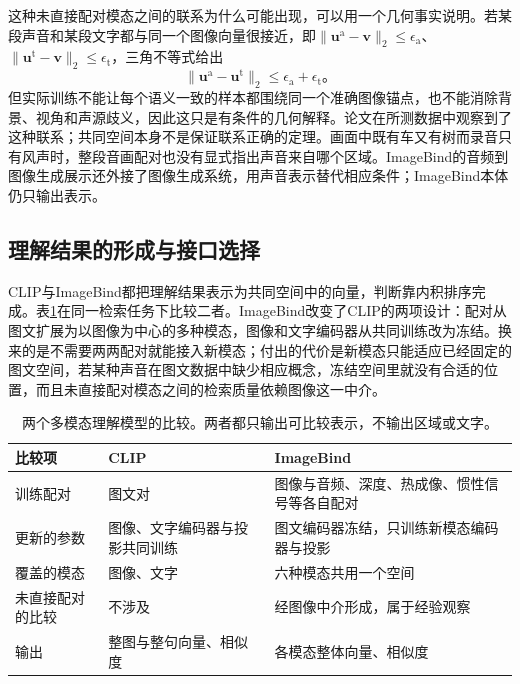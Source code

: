 这种未直接配对模态之间的联系为什么可能出现，可以用一个几何事实说明。若某段声音和某段文字都与同一个图像向量很接近，即$\lVert\bm{u}^{\mathrm a}-\bm v\rVert_2\leq\epsilon_{\mathrm a}$、$\lVert\bm{u}^{\mathrm t}-\bm v\rVert_2\leq\epsilon_{\mathrm t}$，三角不等式给出
\[
  \lVert\bm{u}^{\mathrm a}-\bm{u}^{\mathrm t}\rVert_2
  \leq\epsilon_{\mathrm a}+\epsilon_{\mathrm t}\text{。}
\]
但实际训练不能让每个语义一致的样本都围绕同一个准确图像锚点，也不能消除背景、视角和声源歧义，因此这只是有条件的几何解释。论文在所测数据中观察到了这种联系；共同空间本身不是保证联系正确的定理。画面中既有车又有树而录音只有风声时，整段音画配对也没有显式指出声音来自哪个区域。ImageBind的音频到图像生成展示还外接了图像生成系统，用声音表示替代相应条件；ImageBind本体仍只输出表示。

\subsection{理解结果的形成与接口选择}
\label{sec:vision-models-understanding-interface}

CLIP与ImageBind都把理解结果表示为共同空间中的向量，判断靠内积排序完成。表\ref{tab:vision-models-understanding-compare}在同一检索任务下比较二者。ImageBind改变了CLIP的两项设计：配对从图文扩展为以图像为中心的多种模态，图像和文字编码器从共同训练改为冻结。换来的是不需要两两配对就能接入新模态；付出的代价是新模态只能适应已经固定的图文空间，若某种声音在图文数据中缺少相应概念，冻结空间里就没有合适的位置，而且未直接配对模态之间的检索质量依赖图像这一中介。

\begin{table}[htbp]
  \centering
  \small
  \begin{tabularx}{\linewidth}{@{}p{20mm}XX@{}}
    \toprule
    比较项 & CLIP & ImageBind\\
    \midrule
    训练配对 & 图文对 & 图像与音频、深度、热成像、惯性信号等各自配对\\
    更新的参数 & 图像、文字编码器与投影共同训练 & 图文编码器冻结，只训练新模态编码器与投影\\
    覆盖的模态 & 图像、文字 & 六种模态共用一个空间\\
    未直接配对的比较 & 不涉及 & 经图像中介形成，属于经验观察\\
    输出 & 整图与整句向量、相似度 & 各模态整体向量、相似度\\
    \bottomrule
  \end{tabularx}
  \caption{两个多模态理解模型的比较。两者都只输出可比较表示，不输出区域或文字。}
  \label{tab:vision-models-understanding-compare}
\end{table}

